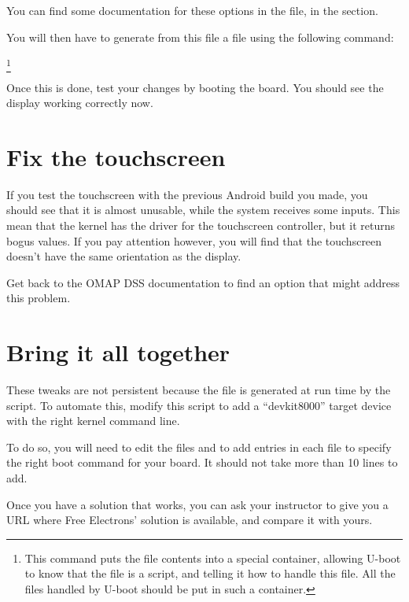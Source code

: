 You can find some documentation for these options in the
 file, in the  section.

You will then have to generate from this  file a  file
using the following command:

\footnote{This command puts the  file contents into a special container,
allowing U-boot to know that the  file is a script, and telling it how to handle
this file. All the files handled by U-boot should be put in such a container.}
 
Once this is done, test your changes by booting the board. You should see the
display working correctly now.

\section{Fix the touchscreen}

If you test the touchscreen with the previous Android build you made, you should
see that it is almost unusable, while the system receives some inputs. This mean
that the kernel has the driver for the touchscreen controller, but it returns
bogus values. If you pay attention however, you will find that the touchscreen
doesn't have the same orientation as the display.

Get back to the OMAP DSS documentation to find an option that might address
this problem.

\section{Bring it all together}

These tweaks are not persistent because the  file is generated at run
time by the  script. To automate this, modify this
script to add a ``devkit8000'' target device with the right kernel command line.

To do so, you will need to edit the files
 and
 to add  entries in each
file to specify the right boot command for your board. It should not take more than 10 lines to
add.

Once you have a solution that works, you can ask your instructor to give 
you a URL where Free Electrons' solution is available, and compare it with yours.

